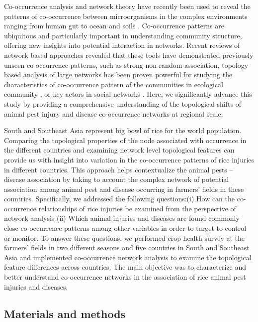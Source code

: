 Co-occurrence analysis and network theory have recently been used to reveal the patterns of co-occurrence between microorganisms in the complex environments ranging from human gut to ocean and soils \citep{Faust_2012_Microbial_co, Ma_2016_Geographic}. Co-occurrence patterns are ubiquitous and particularly important in understanding community structure, offering new insights into potential interaction in networks. Recent reviews of network based approaches revealed that these tools have demonstrated previously unseen co-occurrence patterns, such as strong non-random association, topology based analysis of large networks has been proven powerful for studying the characteristics of co-occurrence pattern of the communities in ecological community \citep{Williams_2014_demonstrating, Barberan_2012_Network}, or key actors in social networks \citep{Crowston_2006_Hierarchy}. Here, we significantly advance this study by providing a comprehensive understanding of the topological shifts of animal pest injury and disease co-occurrence networks at regional scale.

South and Southeast Asia represent big bowl of rice for the world population. Comparing the topological properties of the node associated with occurrence in the different countries and examining network level topological features can provide us with insight into variation in the co-occurrence patterns of rice injuries in different countries. This approach helps contextualize the animal pests -- disease association by taking to account the complex network of potential association among animal pest and disease occurring in farmers’ fields in these countries. Specifically, we addressed the following questions:(i) How can the co-occurrence relationships of rice injuries be examined from the perspective of network analysis (ii) Which animal injuries and diseases are found commonly close co-occurrence patterns among other variables in order to target to control or monitor. To answer these questions, we performed crop health survey at the farmers’ fields in two different seasons and five countries in South and Southeast Asia and implemented co-occurrence network analysis to examine the topological feature differences across countries. The main objective was to characterize and better understand co-occurrence networks in the association of rice animal pest injuries and diseases.

\subsection{Materials and methods} 

